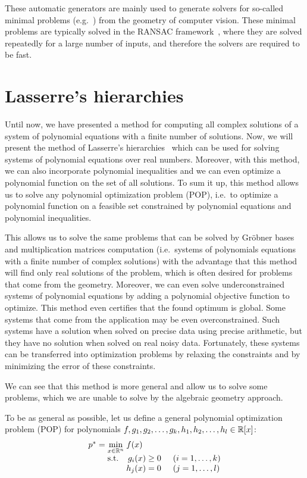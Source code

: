 These automatic generators are mainly used to generate solvers for so-called minimal problems (e.g.~\cite{p3p, 5pt}) from the geometry of computer vision.
These minimal problems are typically solved in the RANSAC framework~\cite{ransac}, where they are solved repeatedly for a large number of inputs, and therefore the solvers are required to be fast.

\section{Lasserre's hierarchies}
Until now, we have presented a method for computing all complex solutions of a system of polynomial equations with a finite number of solutions.
Now, we will present the method of Lasserre's hierarchies~\cite{Lasserre} which can be used for solving systems of polynomial equations over real numbers.
Moreover, with this method, we can also incorporate polynomial inequalities and we can even optimize a polynomial function on the set of all solutions.
To sum it up, this method allows us to solve any polynomial optimization problem (POP), i.e.\ to optimize a polynomial function on a feasible set constrained by polynomial equations and polynomial inequalities.

This allows us to solve the same problems that can be solved by Gr\"obner bases and multiplication matrices computation (i.e.\ systems of polynomials equations with a finite number of complex solutions) with the advantage that this method will find only real solutions of the problem, which is often desired for problems that come from the geometry.
Moreover, we can even solve underconstrained systems of polynomial equations by adding a polynomial objective function to optimize.
This method even certifies that the found optimum is global.
Some systems that come from the application may be even overconstrained.
Such systems have a solution when solved on precise data using precise arithmetic, but they have no solution when solved on real noisy data.
Fortunately, these systems can be transferred into optimization problems by relaxing the constraints and by minimizing the error of these constraints.

We can see that this method is more general and allow us to solve some problems, which we are unable to solve by the algebraic geometry approach.

To be as general as possible, let us define a general polynomial optimization problem (POP) for polynomials $f, g_1, g_2, \ldots, g_k, h_1, h_2, \ldots, h_l\in\mathbb{R}[x]$:
\begin{align}
  \arraycolsep=1.4pt
  \begin{array}{rclrcl@{\hskip0.5cm}l}
    p^* &=& \displaystyle \min_{x\in\R^n} & \multicolumn{3}{l}{f(x)} \\
    && \text{s.t.} & g_i(x) &\geq& 0 & (i = 1,\ldots,k) \\
    &&& h_j(x) &=& 0 & (j = 1,\ldots,l)
  \end{array}\labeleq{pol:lass:pop}
\end{align}

